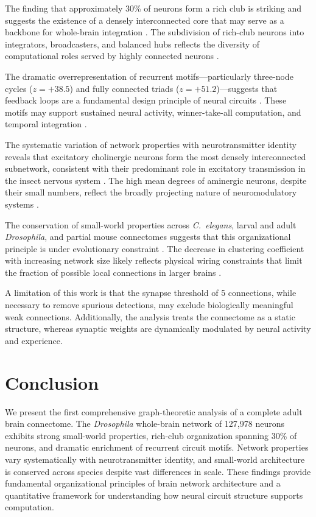 \documentclass[11pt]{article}
\begin{document}
The finding that approximately 30\% of neurons form a rich club is striking and suggests the existence of a densely interconnected core that may serve as a backbone for whole-brain integration \citep{vandenheuvel2011rich}. The subdivision of rich-club neurons into integrators, broadcasters, and balanced hubs reflects the diversity of computational roles served by highly connected neurons \citep{sporns2005human}.

The dramatic overrepresentation of recurrent motifs---particularly three-node cycles ($z = +38.5$) and fully connected triads ($z = +51.2$)---suggests that feedback loops are a fundamental design principle of neural circuits \citep{milo2002network, song2005highly}. These motifs may support sustained neural activity, winner-take-all computation, and temporal integration \citep{prill2005dynamic}.

The systematic variation of network properties with neurotransmitter identity reveals that excitatory cholinergic neurons form the most densely interconnected subnetwork, consistent with their predominant role in excitatory transmission in the insect nervous system \citep{eckstein2024neurotransmitter}. The high mean degrees of aminergic neurons, despite their small numbers, reflect the broadly projecting nature of neuromodulatory systems \citep{caron2012random}.

The conservation of small-world properties across \textit{C.~elegans}, larval and adult \textit{Drosophila}, and partial mouse connectomes suggests that this organizational principle is under evolutionary constraint \citep{bassett2017network}. The decrease in clustering coefficient with increasing network size likely reflects physical wiring constraints that limit the fraction of possible local connections in larger brains \citep{bullmore2012economy}.

A limitation of this work is that the synapse threshold of 5 connections, while necessary to remove spurious detections, may exclude biologically meaningful weak connections. Additionally, the analysis treats the connectome as a static structure, whereas synaptic weights are dynamically modulated by neural activity and experience.

\section{Conclusion}

We present the first comprehensive graph-theoretic analysis of a complete adult brain connectome. The \textit{Drosophila} whole-brain network of 127,978 neurons exhibits strong small-world properties, rich-club organization spanning 30\% of neurons, and dramatic enrichment of recurrent circuit motifs. Network properties vary systematically with neurotransmitter identity, and small-world architecture is conserved across species despite vast differences in scale. These findings provide fundamental organizational principles of brain network architecture and a quantitative framework for understanding how neural circuit structure supports computation.



\end{document}
